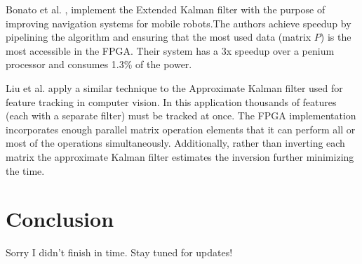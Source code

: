 \documentclass[11pt]{article}
\begin{document}
Bonato et al. \cite{bonato2009floating}, implement the Extended Kalman filter with the purpose of improving navigation systems for mobile robots.The authors achieve speedup by pipelining the algorithm and ensuring that the most used data (matrix $P$) is the most accessible in the FPGA. Their system has a 3x speedup over a penium processor and consumes 1.3\% of the power. 

Liu et al. \cite{liu2007efficient} apply a similar technique to the Approximate Kalman filter used for feature tracking in computer vision. In this application thousands of features (each with a separate filter) must be tracked at once. The FPGA implementation incorporates enough parallel matrix operation elements that it can perform all or most of the operations simultaneously. Additionally, rather than inverting each matrix the approximate Kalman filter estimates the inversion further minimizing the time.

\section{Conclusion}
Sorry I didn't finish in time. Stay tuned for updates!

\nocite{*}


\end{document}
